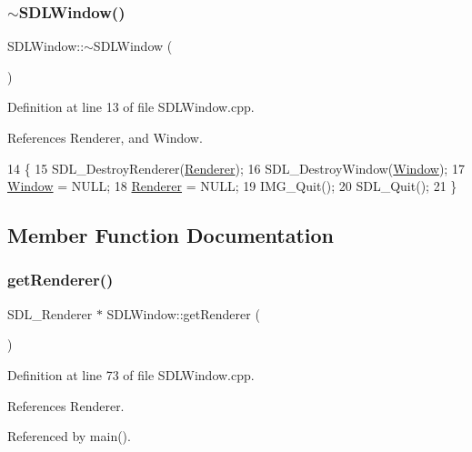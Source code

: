 \subsubsection{\texorpdfstring{$\sim$\+S\+D\+L\+Window()}{~SDLWindow()}}
{\footnotesize\ttfamily S\+D\+L\+Window\+::$\sim$\+S\+D\+L\+Window (\begin{DoxyParamCaption}{ }\end{DoxyParamCaption})}



Definition at line 13 of file S\+D\+L\+Window.\+cpp.



References Renderer, and Window.


\begin{DoxyCode}
14 \{
15     SDL\_DestroyRenderer(\hyperlink{class_s_d_l_window_ae679402fd05b8eb3fd8680f1f036aaca}{Renderer});
16     SDL\_DestroyWindow(\hyperlink{class_s_d_l_window_aa95576b14f59ec62a9e7f6fb8c2f79cc}{Window});
17     \hyperlink{class_s_d_l_window_aa95576b14f59ec62a9e7f6fb8c2f79cc}{Window} = NULL;
18     \hyperlink{class_s_d_l_window_ae679402fd05b8eb3fd8680f1f036aaca}{Renderer} = NULL;
19     IMG\_Quit();
20     SDL\_Quit();
21 \}
\end{DoxyCode}


\subsection{Member Function Documentation}
\mbox{\label{class_s_d_l_window_a9a6d80f754ee6209be95d6c964dea85e}} 
\subsubsection{\texorpdfstring{get\+Renderer()}{getRenderer()}}
{\footnotesize\ttfamily S\+D\+L\+\_\+\+Renderer $\ast$ S\+D\+L\+Window\+::get\+Renderer (\begin{DoxyParamCaption}{ }\end{DoxyParamCaption})}



Definition at line 73 of file S\+D\+L\+Window.\+cpp.



References Renderer.



Referenced by main().


